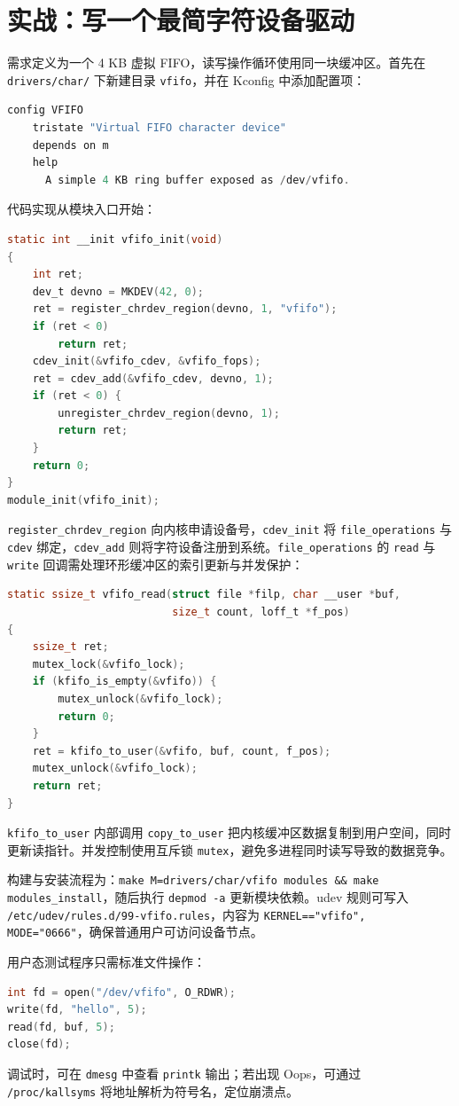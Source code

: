 \chapter{实战：写一个最简字符设备驱动}
需求定义为一个 4 KB 虚拟 FIFO，读写操作循环使用同一块缓冲区。首先在 \texttt{drivers/char/} 下新建目录 \texttt{vfifo}，并在 Kconfig 中添加配置项：\par
\begin{lstlisting}[language=c]
config VFIFO
    tristate "Virtual FIFO character device"
    depends on m
    help
      A simple 4 KB ring buffer exposed as /dev/vfifo.
\end{lstlisting}
代码实现从模块入口开始：\par
\begin{lstlisting}[language=c]
static int __init vfifo_init(void)
{
    int ret;
    dev_t devno = MKDEV(42, 0);
    ret = register_chrdev_region(devno, 1, "vfifo");
    if (ret < 0)
        return ret;
    cdev_init(&vfifo_cdev, &vfifo_fops);
    ret = cdev_add(&vfifo_cdev, devno, 1);
    if (ret < 0) {
        unregister_chrdev_region(devno, 1);
        return ret;
    }
    return 0;
}
module_init(vfifo_init);
\end{lstlisting}
\texttt{register\_{}chrdev\_{}region} 向内核申请设备号，\texttt{cdev\_{}init} 将 \texttt{file\_{}operations} 与 \texttt{cdev} 绑定，\texttt{cdev\_{}add} 则将字符设备注册到系统。\texttt{file\_{}operations} 的 \texttt{read} 与 \texttt{write} 回调需处理环形缓冲区的索引更新与并发保护：\par
\begin{lstlisting}[language=c]
static ssize_t vfifo_read(struct file *filp, char __user *buf,
                          size_t count, loff_t *f_pos)
{
    ssize_t ret;
    mutex_lock(&vfifo_lock);
    if (kfifo_is_empty(&vfifo)) {
        mutex_unlock(&vfifo_lock);
        return 0;
    }
    ret = kfifo_to_user(&vfifo, buf, count, f_pos);
    mutex_unlock(&vfifo_lock);
    return ret;
}
\end{lstlisting}
\texttt{kfifo\_{}to\_{}user} 内部调用 \texttt{copy\_{}to\_{}user} 把内核缓冲区数据复制到用户空间，同时更新读指针。并发控制使用互斥锁 \texttt{mutex}，避免多进程同时读写导致的数据竞争。\par
构建与安装流程为：\texttt{make M=drivers/char/vfifo modules \&{}\&{} make modules\_{}install}，随后执行 \texttt{depmod -a} 更新模块依赖。udev 规则可写入 \texttt{/etc/udev/rules.d/99-vfifo.rules}，内容为 \texttt{KERNEL=="vfifo", MODE="0666"}，确保普通用户可访问设备节点。\par
用户态测试程序只需标准文件操作：\par
\begin{lstlisting}[language=c]
int fd = open("/dev/vfifo", O_RDWR);
write(fd, "hello", 5);
read(fd, buf, 5);
close(fd);
\end{lstlisting}
调试时，可在 \texttt{dmesg} 中查看 \texttt{printk} 输出；若出现 Oops，可通过 \texttt{/proc/kallsyms} 将地址解析为符号名，定位崩溃点。\par

